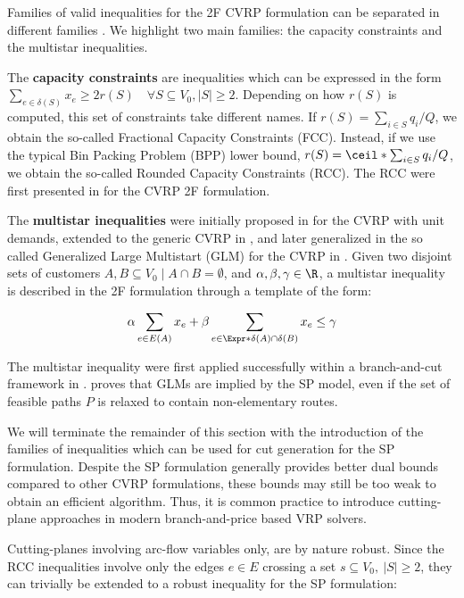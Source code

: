 Families of valid inequalities for the 2F CVRP formulation
can be separated in different families \parencite{toth2014}.
We highlight two main families: the capacity constraints and the multistar inequalities.

The \textbf{capacity constraints} are inequalities which can be expressed in the form
$\sum_{e \in \delta(S)} x_e \ge 2 r(S) \quad \forall S \subseteq V_0, |S| \ge 2$.
Depending on how $r(S)$ is computed, this set of constraints take different names.
If $r(S) = \sum_{i \in S} q_i / Q$, we obtain the so-called Fractional Capacity Constraints (FCC).
Instead, if we use the typical Bin Packing Problem (BPP) lower bound, $r(S) = \ceil*{\sum_{i \in S} q_i / Q}$, we obtain the so-called Rounded Capacity Constraints (RCC).
The RCC were first presented in \textcite{laporte1983} for the CVRP 2F formulation.

The \textbf{multistar inequalities} were initially proposed in \textcite{araque1990} for the CVRP with unit demands,
extended to the generic CVRP in \textcite{gouveia1995, achuthan1998},
and later generalized in the so called Generalized Large Multistart (GLM) for the CVRP in \textcite{letchford2002} .
Given two disjoint sets of customers $A, B \subseteq V_0 \mid A \cap B = \emptyset$,
and $\alpha, \beta, \gamma \in \R$,
a multistar inequality is described in the 2F formulation through a
template of the form:

\begin{equation}
	\alpha \sum_{e \in E(A)} x_e + \beta \sum_{e \in \Expr*{\delta(A) \cap \delta(B)}} x_e \le \gamma
\end{equation}

The multistar inequality were first applied successfully within a branch-and-cut framework
in \textcite{araqueg1994}.
\textcite{letchford2006} proves that GLMs are implied by the SP model,
even if the set of feasible paths $P$ is relaxed to contain non-elementary routes.

\medskip


We will terminate the remainder of this section with the introduction
of the families of inequalities which can be used for cut generation
for the SP formulation.
Despite the SP formulation generally provides better dual bounds
compared to other CVRP formulations,
these bounds may still be too weak to obtain an efficient algorithm.
Thus, it is common practice to introduce cutting-plane approaches
in modern branch-and-price based VRP solvers.

Cutting-planes involving arc-flow variables only, are by nature
robust.
Since the RCC inequalities involve only the edges $e \in E$ crossing a set $s \subseteq V_0,\ |S| \ge 2$,
they can trivially be extended to a robust inequality for the SP formulation:

